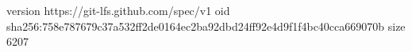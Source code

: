 version https://git-lfs.github.com/spec/v1
oid sha256:758e787679c37a532ff2de0164ec2ba92dbd24ff92e4d9f1f4bc40cca669070b
size 6207
